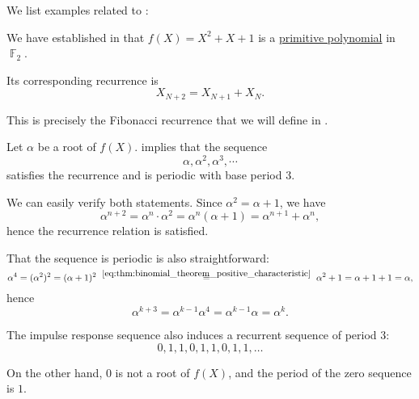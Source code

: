 \begin{example}\label{ex:thm:linear_recurrences_with_maximal_period}
  We list examples related to :
  \begin{thmenum}
     We have established in  that \( f(X) = X^2 + X + 1 \) is a \hyperref[def:finite_field_primitive_polynomial]{primitive polynomial} in \( \BbbF_2 \).

    Its corresponding recurrence is
    \begin{equation*}
      X_{N+2} = X_{N+1} + X_N.
    \end{equation*}

    This is precisely the Fibonacci recurrence that we will define in .

    Let \( \alpha \) be a root of \( f(X) \).  implies that the sequence
    \begin{equation*}
      \alpha, \alpha^2, \alpha^3, \cdots
    \end{equation*}
    satisfies the recurrence and is periodic with base period \( 3 \).

    We can easily verify both statements. Since \( \alpha^2 = \alpha + 1 \), we have
    \begin{equation*}
      \alpha^{n+2} = \alpha^n \cdot \alpha^2 = \alpha^n (\alpha + 1) = \alpha^{n+1} + \alpha^n,
    \end{equation*}
    hence the recurrence relation is satisfied.

    That the sequence is periodic is also straightforward:
    \begin{equation*}
      \alpha^4
      =
      (\alpha^2)^2
      =
      (\alpha + 1)^2
      \reloset {\eqref{eq:thm:binomial_theorem_positive_characteristic}} =
      \alpha^2 + 1
      =
      \alpha + 1 + 1
      =
      \alpha,
    \end{equation*}
    hence
    \begin{equation*}
      \alpha^{k+3}
      =
      \alpha^{k-1} \alpha^4
      =
      \alpha^{k-1} \alpha
      =
      \alpha^k.
    \end{equation*}

    The impulse response sequence also induces a recurrent sequence of period \( 3 \):
    \begin{equation*}
      0, 1, 1, 0, 1, 1, 0, 1, 1, \ldots
    \end{equation*}

    On the other hand, \( 0 \) is not a root of \( f(X) \), and the period of the zero sequence is \( 1 \).
  \end{thmenum}
\end{example}

